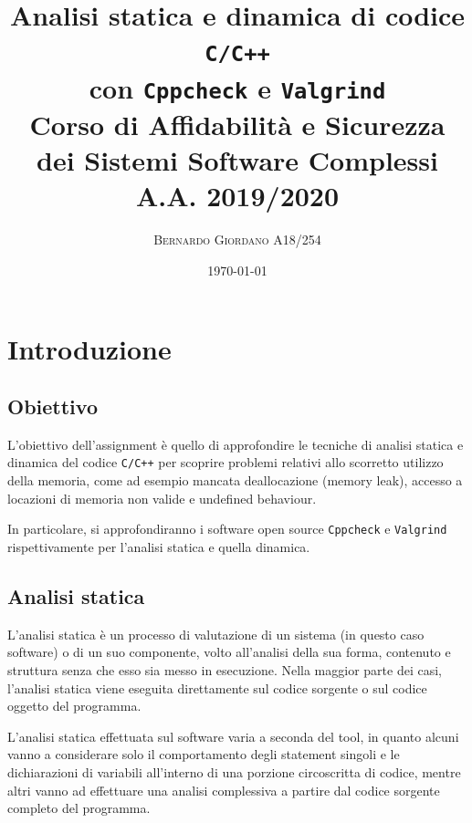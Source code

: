 \documentclass{article}
\title{
    Analisi statica e dinamica di codice \texttt{C/C++} \\ con
    \texttt{Cppcheck} e \texttt{Valgrind} \\ \vspace{16px}
    \small Corso di Affidabilità e Sicurezza \\ dei Sistemi Software Complessi A.A. 2019/2020
}
\author{\textsc{Bernardo Giordano A18/254}}
\date{\today}
\begin{document}
\maketitle

\newpage

\tableofcontents

\newpage


\section{Introduzione}

\subsection{Obiettivo}
\label{sec:obiettivo}

L'obiettivo dell'assignment è quello di approfondire le tecniche di analisi
statica e dinamica del codice \texttt{C/C++} per scoprire problemi relativi allo
scorretto utilizzo della memoria, come ad esempio mancata deallocazione (memory
leak), accesso a locazioni di memoria non valide e undefined behaviour.

In particolare, si approfondiranno i software open source \texttt{Cppcheck} e
\texttt{Valgrind} rispettivamente per l'analisi statica e quella dinamica.

\subsection{Analisi statica}
\label{sec:analisistatica}

L'analisi statica è un processo di valutazione di un sistema (in questo caso
software) o di un suo componente, volto all'analisi della sua forma, contenuto e
struttura senza che esso sia messo in esecuzione. Nella maggior parte dei casi,
l'analisi statica viene eseguita direttamente sul codice sorgente o sul codice
oggetto del programma.

L'analisi statica effettuata sul software varia a seconda del tool, in quanto
alcuni vanno a considerare solo il comportamento degli statement singoli e le
dichiarazioni di variabili all'interno di una porzione circoscritta di codice,
mentre altri vanno ad effettuare una analisi complessiva a partire dal codice
sorgente completo del programma. 
\end{document}
